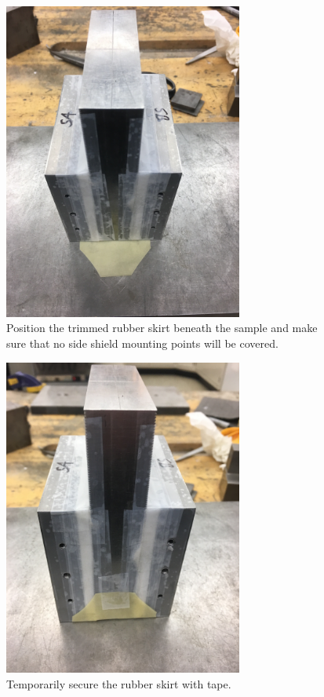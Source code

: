 \begin{figure}
	\centering
        \includegraphics[width=0.7\textwidth]{appendix_sample_prep/dds_trimmed_rubber.jpg}
   	\caption{Position the trimmed rubber skirt beneath the sample and make sure that no side shield mounting points will be covered.}
  	\label{Fig:dds_trimmed_rubber}
\end{figure}

\begin{figure}
	\centering
        \includegraphics[width=0.7\textwidth]{appendix_sample_prep/dds_taped_rubber.jpg}
   	\caption{Temporarily secure the rubber skirt with tape.}
  	\label{Fig:dds_taped_rubber}
\end{figure}

